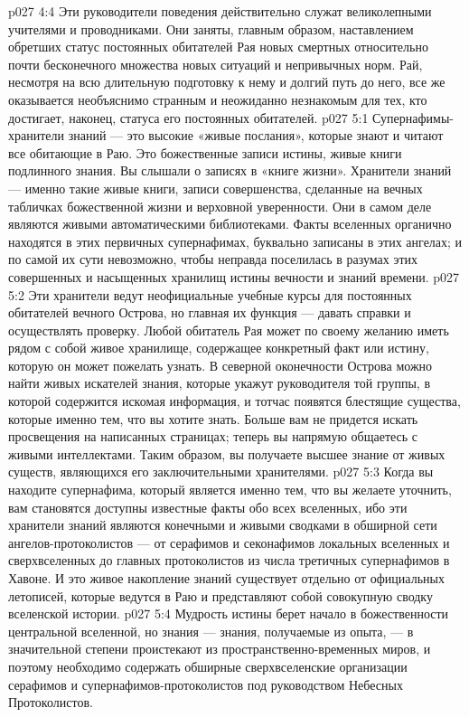 \vs p027 4:4 Эти руководители поведения действительно служат великолепными учителями и проводниками. Они заняты, главным образом, наставлением обретших статус постоянных обитателей Рая новых смертных относительно почти бесконечного множества новых ситуаций и непривычных норм. Рай, несмотря на всю длительную подготовку к нему и долгий путь до него, все же оказывается необъяснимо странным и неожиданно незнакомым для тех, кто достигает, наконец, статуса его постоянных обитателей.
\vs p027 5:1 Супернафимы\hyp{}хранители знаний --- это высокие «живые послания», которые знают и читают все обитающие в Раю. Это божественные записи истины, живые книги подлинного знания. Вы слышали о записях в «книге жизни». Хранители знаний --- именно такие живые книги, записи совершенства, сделанные на вечных табличках божественной жизни и верховной уверенности. Они в самом деле являются живыми автоматическими библиотеками. Факты вселенных органично находятся в этих первичных супернафимах, буквально записаны в этих ангелах; и по самой их сути невозможно, чтобы неправда поселилась в разумах этих совершенных и насыщенных хранилищ истины вечности и знаний времени.
\vs p027 5:2 Эти хранители ведут неофициальные учебные курсы для постоянных обитателей вечного Острова, но главная их функция --- давать справки и осуществлять проверку. Любой обитатель Рая может по своему желанию иметь рядом с собой живое хранилище, содержащее конкретный факт или истину, которую он может пожелать узнать. В северной оконечности Острова можно найти живых искателей знания, которые укажут руководителя той группы, в которой содержится искомая информация, и тотчас появятся блестящие существа, которые  именно тем, что вы хотите знать. Больше вам не придется искать просвещения на написанных страницах; теперь вы напрямую общаетесь с живыми интеллектами. Таким образом, вы получаете высшее знание от живых существ, являющихся его заключительными хранителями.
\vs p027 5:3 Когда вы находите супернафима, который является именно тем, что вы желаете уточнить, вам становятся доступны  известные факты обо всех вселенных, ибо эти хранители знаний являются конечными и живыми сводками в обширной сети ангелов\hyp{}протоколистов --- от серафимов и секонафимов локальных вселенных и сверхвселенных до главных протоколистов из числа третичных супернафимов в Хавоне. И это живое накопление знаний существует отдельно от официальных летописей, которые ведутся в Раю и представляют собой совокупную сводку вселенской истории.
\vs p027 5:4 Мудрость истины берет начало в божественности центральной вселенной, но знания --- знания, получаемые из опыта, --- в значительной степени проистекают из пространственно\hyp{}временных миров, и поэтому необходимо содержать обширные сверхвселенские организации серафимов и супернафимов\hyp{}протоколистов под руководством Небесных Протоколистов.
